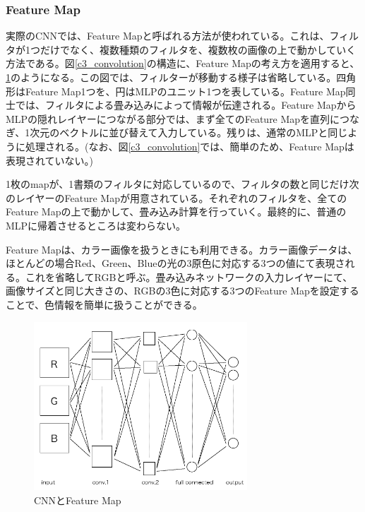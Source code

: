 \subsubsection{Feature Map}
実際のCNNでは、Feature Mapと呼ばれる方法が使われている。これは、フィルタが1つだけでなく、複数種類のフィルタを、複数枚の画像の上で動かしていく方法である。図\ref{c3_convolution}の構造に、Feature Mapの考え方を適用すると、\ref{c3_feature_map}のようになる。この図では、フィルターが移動する様子は省略している。四角形はFeature Map1つを、円はMLPのユニット1つを表している。Feature Map同士では、フィルタによる畳み込みによって情報が伝達される。Feature MapからMLPの隠れレイヤーにつながる部分では、まず全てのFeature Mapを直列につなぎ、1次元のベクトルに並び替えて入力している。残りは、通常のMLPと同じように処理される。(なお、図\ref{c3_convolution}では、簡単のため、Feature Mapは表現されていない。)\par
1枚のmapが、1書類のフィルタに対応しているので、フィルタの数と同じだけ次のレイヤーのFeature Mapが用意されている。それぞれのフィルタを、全てのFeature Mapの上で動かして、畳み込み計算を行っていく。最終的に、普通のMLPに帰着させるところは変わらない。\par
Feature Mapは、カラー画像を扱うときにも利用できる。カラー画像データは、ほとんどの場合Red、Green、Blueの光の3原色に対応する3つの値にて表現される。これを省略してRGBと呼ぶ。畳み込みネットワークの入力レイヤーにて、画像サイズと同じ大きさの、RGBの3色に対応する3つのFeature Mapを設定することで、色情報を簡単に扱うことができる。

\begin{figure}[tbp]
 \centering
  \includegraphics[width=80mm]{img/c3/feature_map}
 \caption{CNNとFeature Map}
 \label{c3_feature_map}
\end{figure}

